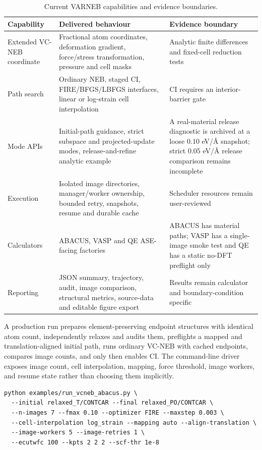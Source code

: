 \documentclass[final,3p,times]{elsarticle}
\begin{document}
\begin{table}[t]
\centering
\caption{Current VARNEB capabilities and evidence boundaries.}
\label{tab:capabilities}
\begin{tabularx}{\textwidth}{p{}X p{}}
\toprule
Capability & Delivered behaviour & Evidence boundary \\
\midrule
Extended VC-NEB coordinate & Fractional atom coordinates, deformation gradient,
force/stress transformation, pressure and cell masks & Analytic finite differences
and fixed-cell reduction tests \\
Path search & Ordinary NEB, staged CI, FIRE/BFGS/LBFGS interfaces, linear or
log-strain cell interpolation & CI requires an interior-barrier gate \\
Mode APIs & Initial-path guidance, strict subspace and projected-update modes,
release-and-refine analytic example & A real-material release diagnostic is
archived at a loose $0.10$ eV/\AA{} snapshot; strict $0.05$ eV/\AA{} release
comparison remains incomplete \\
Execution & Isolated image directories, manager/worker ownership, bounded retry,
snapshots, resume and durable cache & Scheduler resources remain user-reviewed \\
Calculators & ABACUS, VASP and QE ASE-facing factories & ABACUS has material paths;
VASP has a single-image smoke test and QE has a static no-DFT preflight only \\
Reporting & JSON summary, trajectory, audit, image comparison, structural metrics,
source-data and editable figure export & Results remain calculator and
boundary-condition specific \\
\bottomrule
\end{tabularx}
\end{table}

A production run prepares element-preserving endpoint structures with identical
atom count, independently relaxes and audits them, preflights a mapped and
translation-aligned initial path, runs ordinary VC-NEB with cached endpoints,
compares image counts, and only then enables CI. The command-line driver
exposes image count, cell interpolation, mapping, force threshold, image
workers, and resume state rather than choosing them implicitly.

\begin{lstlisting}[caption={Illustrative ABACUS production invocation.},label={lst:abacus}]
python examples/run_vcneb_abacus.py \
  --initial relaxed_T/CONTCAR --final relaxed_PO/CONTCAR \
  --n-images 7 --fmax 0.10 --optimizer FIRE --maxstep 0.003 \
  --cell-interpolation log_strain --mapping auto --align-translation \
  --image-workers 5 --image-retries 1 \
  --ecutwfc 100 --kpts 2 2 2 --scf-thr 1e-8
\end{lstlisting}
\end{document}
